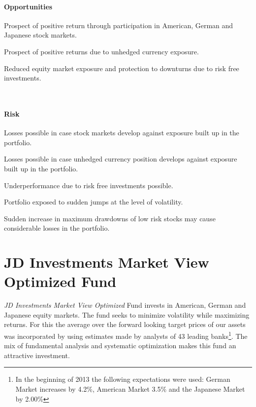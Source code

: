 \documentclass[11pt, parskip=full, DIV=14]{scrreprt}
\begin{document}
\begin{minipage}[t]{0.49\textwidth}
  \paragraph{Opportunities}
  \begin{sit}
    \item Prospect of positive return through participation in American, German and Japanese stock markets.
    \item Prospect of positive returns due to unhedged currency exposure.
    \item Reduced equity market exposure and protection to downturns due to risk free investments.
  \end{sit}
\end{minipage}
~~
\begin{minipage}[t]{0.49\textwidth}
  \paragraph{Risk}
  \begin{sit}
    \item Losses possible in case stock markets develop against exposure built up in the portfolio.
    \item Losses possible in case unhedged currency position develops against exposure built up in the portfolio.
    \item Underperformance due to risk free investments possible.
    \item Portfolio exposed to sudden jumps at the level of volatility.
    \item Sudden increase in maximum drawdowns of low risk stocks may cause considerable losses in the portfolio.
  \end{sit}
\end{minipage}

\newpage\section*{JD Investments Market View Optimized Fund}
\textit{JD Investments Market View Optimized} Fund invests in American, German and Japanese equity markets.
The fund seeks to minimize volatility while maximizing returns.
For this the average over the forward looking target prices of our assets was incorporated by using estimates made by analysts of 43 leading banks\footnote{In the beginning of 2013 the following expectations were used: German Market increases by 4.2\%, American Market 3.5\% and the Japanese Market by 2.00\%}.
The mix of fundamental analysis and systematic optimization makes this fund an attractive investment.
\end{document}
